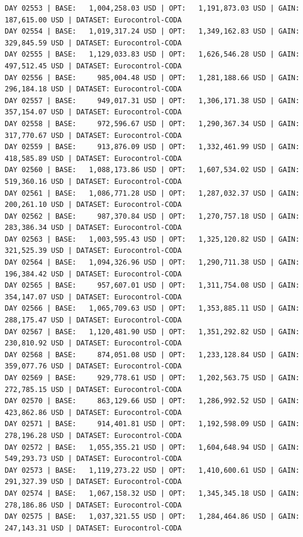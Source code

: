 \documentclass[11pt,a4paper]{article}
\begin{document}
\begin{verbatim}
DAY 02553 | BASE:   1,004,258.03 USD | OPT:   1,191,873.03 USD | GAIN: 187,615.00 USD | DATASET: Eurocontrol-CODA
DAY 02554 | BASE:   1,019,317.24 USD | OPT:   1,349,162.83 USD | GAIN: 329,845.59 USD | DATASET: Eurocontrol-CODA
DAY 02555 | BASE:   1,129,033.83 USD | OPT:   1,626,546.28 USD | GAIN: 497,512.45 USD | DATASET: Eurocontrol-CODA
DAY 02556 | BASE:     985,004.48 USD | OPT:   1,281,188.66 USD | GAIN: 296,184.18 USD | DATASET: Eurocontrol-CODA
DAY 02557 | BASE:     949,017.31 USD | OPT:   1,306,171.38 USD | GAIN: 357,154.07 USD | DATASET: Eurocontrol-CODA
DAY 02558 | BASE:     972,596.67 USD | OPT:   1,290,367.34 USD | GAIN: 317,770.67 USD | DATASET: Eurocontrol-CODA
DAY 02559 | BASE:     913,876.09 USD | OPT:   1,332,461.99 USD | GAIN: 418,585.89 USD | DATASET: Eurocontrol-CODA
DAY 02560 | BASE:   1,088,173.86 USD | OPT:   1,607,534.02 USD | GAIN: 519,360.16 USD | DATASET: Eurocontrol-CODA
DAY 02561 | BASE:   1,086,771.28 USD | OPT:   1,287,032.37 USD | GAIN: 200,261.10 USD | DATASET: Eurocontrol-CODA
DAY 02562 | BASE:     987,370.84 USD | OPT:   1,270,757.18 USD | GAIN: 283,386.34 USD | DATASET: Eurocontrol-CODA
DAY 02563 | BASE:   1,003,595.43 USD | OPT:   1,325,120.82 USD | GAIN: 321,525.39 USD | DATASET: Eurocontrol-CODA
DAY 02564 | BASE:   1,094,326.96 USD | OPT:   1,290,711.38 USD | GAIN: 196,384.42 USD | DATASET: Eurocontrol-CODA
DAY 02565 | BASE:     957,607.01 USD | OPT:   1,311,754.08 USD | GAIN: 354,147.07 USD | DATASET: Eurocontrol-CODA
DAY 02566 | BASE:   1,065,709.63 USD | OPT:   1,353,885.11 USD | GAIN: 288,175.47 USD | DATASET: Eurocontrol-CODA
DAY 02567 | BASE:   1,120,481.90 USD | OPT:   1,351,292.82 USD | GAIN: 230,810.92 USD | DATASET: Eurocontrol-CODA
DAY 02568 | BASE:     874,051.08 USD | OPT:   1,233,128.84 USD | GAIN: 359,077.76 USD | DATASET: Eurocontrol-CODA
DAY 02569 | BASE:     929,778.61 USD | OPT:   1,202,563.75 USD | GAIN: 272,785.15 USD | DATASET: Eurocontrol-CODA
DAY 02570 | BASE:     863,129.66 USD | OPT:   1,286,992.52 USD | GAIN: 423,862.86 USD | DATASET: Eurocontrol-CODA
DAY 02571 | BASE:     914,401.81 USD | OPT:   1,192,598.09 USD | GAIN: 278,196.28 USD | DATASET: Eurocontrol-CODA
DAY 02572 | BASE:   1,055,355.21 USD | OPT:   1,604,648.94 USD | GAIN: 549,293.73 USD | DATASET: Eurocontrol-CODA
DAY 02573 | BASE:   1,119,273.22 USD | OPT:   1,410,600.61 USD | GAIN: 291,327.39 USD | DATASET: Eurocontrol-CODA
DAY 02574 | BASE:   1,067,158.32 USD | OPT:   1,345,345.18 USD | GAIN: 278,186.86 USD | DATASET: Eurocontrol-CODA
DAY 02575 | BASE:   1,037,321.55 USD | OPT:   1,284,464.86 USD | GAIN: 247,143.31 USD | DATASET: Eurocontrol-CODA

\end{verbatim}
\end{document}
